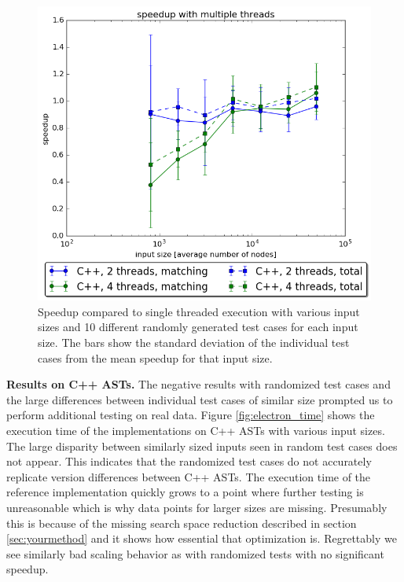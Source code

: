 \documentclass[letterpaper]{article}
\newcommand{\mypar}[1]{{\bf #1.}}
\begin{document}
\begin{figure}
	\includegraphics[width=\linewidth]{measurements/random/speedupPlot_c}
	\caption{Speedup compared to single threaded execution with various input sizes and 10 different randomly generated test cases for each input size. The bars show the standard deviation of the individual test cases from the mean speedup for that input size.}
	\label{fig:cpp_speedup}
\end{figure}

\mypar{Results on C++ ASTs}
The negative results with randomized test cases and the large differences between individual test cases of similar size prompted us to perform additional testing on real data.
Figure \ref{fig:electron_time} shows the execution time of the implementations on C++ ASTs with various input sizes.
The large disparity between similarly sized inputs seen in random test cases does not appear.
This indicates that the randomized test cases do not accurately replicate version differences between C++ ASTs.
The execution time of the reference implementation quickly grows to a point where further testing is unreasonable which is why data points for larger sizes are missing.
Presumably this is because of the missing search space reduction described in section \ref{sec:yourmethod} and it shows how essential that optimization is.
Regrettably we see similarly bad scaling behavior as with randomized tests with no significant speedup.
\end{document}
